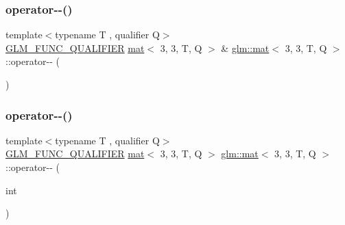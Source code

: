 \subsubsection{\texorpdfstring{operator-\/-\/()}{operator--()}\hspace{0.1cm}{\footnotesize\ttfamily [1/2]}}
{\footnotesize\ttfamily template$<$typename T , qualifier Q$>$ \\
\hyperlink{setup_8hpp_a33fdea6f91c5f834105f7415e2a64407}{G\+L\+M\+\_\+\+F\+U\+N\+C\+\_\+\+Q\+U\+A\+L\+I\+F\+I\+ER} \hyperlink{structglm_1_1mat}{mat}$<$ 3, 3, T, Q $>$ \& \hyperlink{structglm_1_1mat}{glm\+::mat}$<$ 3, 3, T, Q $>$\+::operator-\/-\/ (\begin{DoxyParamCaption}{ }\end{DoxyParamCaption})}

\mbox{\label{structglm_1_1mat_3_013_00_013_00_01_t_00_01_q_01_4_a7d3a048df9c2f4e1ba2495b60655db4b}} 
\subsubsection{\texorpdfstring{operator-\/-\/()}{operator--()}\hspace{0.1cm}{\footnotesize\ttfamily [2/2]}}
{\footnotesize\ttfamily template$<$typename T , qualifier Q$>$ \\
\hyperlink{setup_8hpp_a33fdea6f91c5f834105f7415e2a64407}{G\+L\+M\+\_\+\+F\+U\+N\+C\+\_\+\+Q\+U\+A\+L\+I\+F\+I\+ER} \hyperlink{structglm_1_1mat}{mat}$<$ 3, 3, T, Q $>$ \hyperlink{structglm_1_1mat}{glm\+::mat}$<$ 3, 3, T, Q $>$\+::operator-\/-\/ (\begin{DoxyParamCaption}\item[{int}]{ }\end{DoxyParamCaption})}

\mbox{\label{structglm_1_1mat_3_013_00_013_00_01_t_00_01_q_01_4_aed487ca4202482113e6399e7c63e2707}} 
